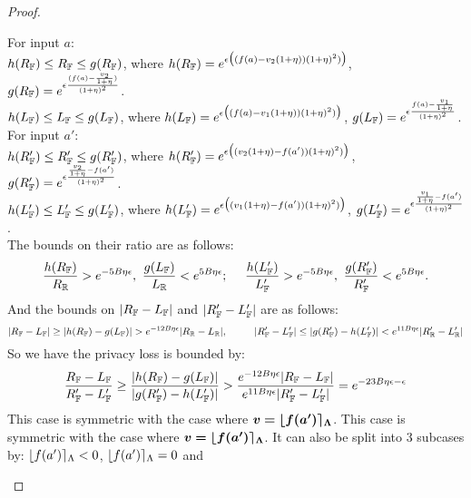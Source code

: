 \documentclass[a4paper,11pt]{article}
\begin{document}
\begin{proof}
\begin{itemize}
		For input $a$:
		\\
		$h(R_{\mathbb{F}}) \leq R_{\mathbb{F}} \leq g(R_{\mathbb{F}})$, where
		$h(R_{\mathbb{F}}) = e^{\epsilon 
				\big( (f(a) - v_2(1 + \eta)) (1 + \eta)^2) \big)}$, 
		$g(R_{\mathbb{F}}) = e^{\epsilon 
				\frac{(f(a) - \frac{v_2}{1 + \eta})}{(1 + \eta)^2}}$.  
		\\
		$h(L_{\mathbb{F}}) \leq L_{\mathbb{F}} \leq g(L_{\mathbb{F}})$, where
		$h(L_{\mathbb{F}}) = e^{\epsilon 
				\big( (f(a) - v_1(1 + \eta)) (1 + \eta)^2) \big)}$, 
		$g(L_{\mathbb{F}}) = e^{\epsilon 
				\frac{f(a) - \frac{v_1}{1 + \eta}}{(1 + \eta)^2}}$.
		\\
		For input $a'$:
		\\
		$h(R_{\mathbb{F}}') \leq R_{\mathbb{F}}' \leq g(R_{\mathbb{F}}')$, where
		$h(R_{\mathbb{F}}') = e^{\epsilon 
				\big( (v_2(1 + \eta) - f(a')) (1 + \eta)^2) \big)}$, 
		$g(R_{\mathbb{F}}') = e^{\epsilon 
				\frac{ \frac{v_2}{1 + \eta} - f(a') }{(1 + \eta)^2}}$.
		\\
		$h(L_{\mathbb{F}}') \leq L_{\mathbb{F}}' \leq g(L_{\mathbb{F}}')$, where
		$h(L_{\mathbb{F}}') = e^{\epsilon 
				\big( (v_1(1 + \eta) - f(a') ) (1 + \eta)^2) \big)}$,
		$g(L_{\mathbb{F}}') = e^{\epsilon 
				\frac{\frac{v_1}{1 + \eta} - f(a') }{(1 + \eta)^2}}$.
		\\
		The bounds on their ratio are as follows:
		\[
		\frac{h(R_{\mathbb{F}})}{R_{\mathbb{R}}} 
		> e^{-5B\eta \epsilon}, 
		~ \frac{g(L_{\mathbb{F}})}{L_{\mathbb{R}}} 
		< e^{5B\eta \epsilon};
		~~~~
		\frac{h(L_{\mathbb{F}}')}{L_{\mathbb{F}}'} 
		> e^{-5B\eta \epsilon}, 
		~ \frac{g(R_{\mathbb{F}}')}{R_{\mathbb{F}}'}
		< e^{5B\eta \epsilon}.
		\]
		And the bounds on $|R_{\mathbb{F}} - L_{\mathbb{F}}|$
		and
		$|R_{\mathbb{F}}' - L_{\mathbb{F}}'|$ are as follows:
		\[
		|R_{\mathbb{F}} - L_{\mathbb{F}}|
		\geq
		|h(R_{\mathbb{F}}) - g(L_{\mathbb{F}})| 
		> e^{-12 B\eta \epsilon}|R_{\mathbb{R}} - L_{\mathbb{R}}|, 
		~~~~~~~~
		|R_{\mathbb{F}}' - L_{\mathbb{F}}'|
		\leq
		|g(R_{\mathbb{F}}') - h(L_{\mathbb{F}}')| 
		< e^{11 B\eta \epsilon}|R_{\mathbb{R}}' - L_{\mathbb{R}}'|
		\]
		So we have the privacy loss is bounded by:
		\[
		\frac
		{R_{\mathbb{F}} - L_{\mathbb{F}}}
		{R_{\mathbb{F}}' - L_{\mathbb{F}}'}
		\geq
		\frac{|h(R_{\mathbb{F}}) - g(L_{\mathbb{F}})|}
		{|g(R_{\mathbb{F}}') - h(L_{\mathbb{F}}')|}
		> \frac{e^{-12 B\eta \epsilon}
		|R_{\mathbb{F}} - L_{\mathbb{F}}|}
		{e^{11 B\eta \epsilon}|R_{\mathbb{F}}' - L_{\mathbb{F}}'|}
		= e^{-23B \eta \epsilon - \epsilon}
		\]
	This case is symmetric with the case where 
	$\boldsymbol{v = \lfloor f(a') \rceil_{\Lambda}}$.
	This case is symmetric with the case where 
	$\boldsymbol{v = \lfloor f(a') \rceil_{\Lambda}}$.
		It can also be split into 3 subcases by:
		$\lfloor f(a') \rceil_{\Lambda} < 0$, 
		$\lfloor f(a') \rceil_{\Lambda} = 0$ and 

\end{itemize}
\end{proof}
\end{document}
